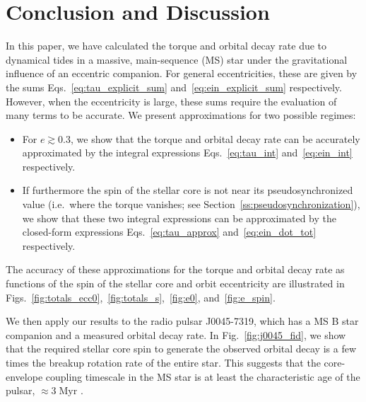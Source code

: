 \documentclass[
        fleqn,
        usenatbib,
    ]{mnras}
\begin{document}
\section{Conclusion and Discussion}\label{s:disc}

In this paper, we have calculated the torque and orbital decay rate due to
dynamical tides in a massive, main-sequence (MS) star under the gravitational
influence of an eccentric companion. For general eccentricities, these are
given by the sums Eqs.~\eqref{eq:tau_explicit_sum}
and~\eqref{eq:ein_explicit_sum} respectively. However, when the eccentricity is
large, these sums require the evaluation of many terms to be accurate. We
present approximations for two possible regimes:
\begin{itemize}
    \item For $e \gtrsim 0.3$, we show that the torque and orbital decay rate
        can be accurately approximated by the integral expressions
        Eqs.~\eqref{eq:tau_int} and~\eqref{eq:ein_int} respectively.

    \item If furthermore the spin of the stellar core is not near its
        pseudosynchronized value (i.e.\ where the torque vanishes; see
        Section~\ref{ss:pseudosynchronization}), we show that these two integral
        expressions can be approximated by the closed-form expressions
        Eqs.~\eqref{eq:tau_approx} and~\eqref{eq:ein_dot_tot} respectively.
\end{itemize}
The accuracy of these approximations for the torque and orbital decay rate as
functions of the spin of the stellar core and orbit eccentricity are illustrated
in Figs.~\ref{fig:totals_ecc0},~\ref{fig:totals_s},~\ref{fig:e0},
and~\ref{fig:e_spin}.

We then apply our results to the radio pulsar J0045-7319, which has a MS B star
companion and a measured orbital decay rate. In Fig.~\ref{fig:j0045_fid}, we
show that the required stellar core spin to generate the observed orbital decay
is a few times the breakup rotation rate of the entire star. This suggests that
the core-envelope coupling timescale in the MS star is at least the
characteristic age of the pulsar, $\approx 3\;\mathrm{Myr}$
\citep{kaspi1996params}.
\end{document}
